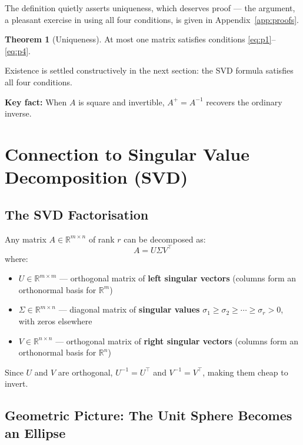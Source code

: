 \documentclass[12pt, a4paper]{article}
\theoremstyle{definition}
\newtheorem{theorem}{Theorem}
\begin{document}
The definition quietly asserts uniqueness, which deserves proof — the argument, a pleasant exercise in using all four conditions, is given in Appendix~\ref{app:proofs}.

\begin{theorem}[Uniqueness]
\label{thm:uniqueness}
At most one matrix satisfies conditions \eqref{eq:p1}--\eqref{eq:p4}.
\end{theorem}

Existence is settled constructively in the next section: the SVD formula satisfies all four conditions.

\begin{keybox}
\textbf{Key fact:} When $A$ is square and invertible, $A^+ = A^{-1}$ recovers the ordinary inverse.
\end{keybox}

\section{Connection to Singular Value Decomposition (SVD)}

\subsection{The SVD Factorisation}

Any matrix $A \in \mathbb{R}^{m \times n}$ of rank $r$ can be decomposed as:
\[
    A = U \Sigma V^\top
\]
where:
\begin{itemize}
    \item $U \in \mathbb{R}^{m \times m}$ — orthogonal matrix of \textbf{left singular vectors} (columns form an orthonormal basis for $\mathbb{R}^m$)
    \item $\Sigma \in \mathbb{R}^{m \times n}$ — diagonal matrix of \textbf{singular values} $\sigma_1 \geq \sigma_2 \geq \cdots \geq \sigma_r > 0$, with zeros elsewhere
    \item $V \in \mathbb{R}^{n \times n}$ — orthogonal matrix of \textbf{right singular vectors} (columns form an orthonormal basis for $\mathbb{R}^n$)
\end{itemize}

Since $U$ and $V$ are orthogonal, $U^{-1} = U^\top$ and $V^{-1} = V^\top$, making them cheap to invert.

\subsection{Geometric Picture: The Unit Sphere Becomes an Ellipse}
\end{document}
